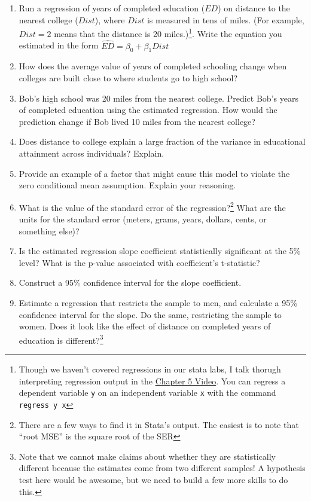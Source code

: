 \documentclass[
]{article}
\begin{document}
\begin{enumerate}
\begin{enumerate}
\def\labelenumi{\alph{enumi}.}
\item
  Run a regression of years of completed education (\(ED\)) on distance
  to the nearest college (\(Dist\)), where \(Dist\) is measured in tens
  of miles. (For example, \(Dist=2\) means that the distance is 20
  miles.)\footnote{Though we haven't covered regressions in our stata
    labs, I talk thorugh interpreting regression output in the
    \href{https://youtu.be/DZo5m5q3bmA}{Chapter 5 Video}. You can
    regress a dependent variable \texttt{y} on an independent variable
    \texttt{x} with the command \texttt{regress\ y\ x}}. Write the
  equation you estimated in the form
  \(\widehat{ED} = \beta_0 + \beta_1 Dist\)
\item
  How does the average value of years of completed schooling change when
  colleges are built close to where students go to high school?
\item
  Bob's high school was 20 miles from the nearest college. Predict Bob's
  years of completed education using the estimated regression. How would
  the prediction change if Bob lived 10 miles from the nearest college?
\item
  Does distance to college explain a large fraction of the variance in
  educational attainment across individuals? Explain.
\item
  Provide an example of a factor that might cause this model to violate
  the zero conditional mean assumption. Explain your reasoning.
\item
  What is the value of the standard error of the regression?\footnote{There
    are a few ways to find it in Stata's output. The easiest is to note
    that ``root MSE'' is the square root of the SER} What are the units
  for the standard error (meters, grams, years, dollars, cents, or
  something else)?
\item
  Is the estimated regression slope coefficient statistically
  significant at the 5\% level? What is the p-value associated with
  coefficient's t-statistic?
\item
  Construct a 95\% confidence interval for the slope coefficient.
\item
  Estimate a regression that restricts the sample to men, and calculate
  a 95\% confidence interval for the slope. Do the same, restricting the
  sample to women. Does it look like the effect of distance on completed
  years of education is different?\footnote{Note that we cannot make
    claims about whether they are statistically different because the
    estimates come from two different samples! A hypothesis test here
    would be awesome, but we need to build a few more skills to do this.}
\end{enumerate}
\end{enumerate}
\end{document}
